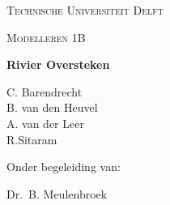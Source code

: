 

\begin{comment}
\renewcommand{\ThisLRCornerWallPaper}[2]{%
  \AddToShipoutPicture*{%
    \AtPageLowerLeft{%
      \parbox[b]{\paperwidth}{%
        \hfill \texttt{[image: \#2]}%
	\hspace{1cm}\vspace{0.5cm}
      }
    }
  }
}

\renewcommand{\ThisLLCornerWallPaper}[2]{%
\AddToShipoutPicture*{%
  \AtPageLowerLeft{%
  	\parbox[b]{\paperwidth}{%
		\hspace{0.8cm}    
   	 	\texttt{[image: \#2]}%
		\vspace{0.5cm}    
	}
   }
  }
}
\end{comment}

\begin{titlepage}


	\centering
	{\scshape\Large Technische Universiteit Delft\par}
	\vspace{1cm}
	{\scshape\Large Modelleren 1B\par}
	\vspace{1.5cm}
	{\Huge\bfseries Rivier Oversteken\par}
	\vspace{2cm}
	{\Large
	C. Barendrecht\\ 
	B. van den Heuvel\\
	A. van der Leer\\
	R.Sitaram\par}
	\vfill
	Onder begeleiding van:\par
	Dr.~B. Meulenbroek

	\vfill
\end{titlepage}
\ClearWallPaper